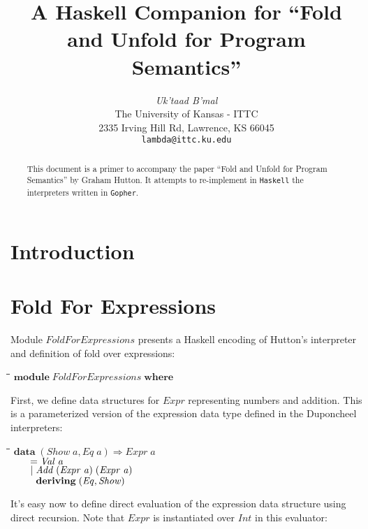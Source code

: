 \documentclass[10pt]{article}
\title{A Haskell Companion for ``Fold and Unfold for Program Semantics''}
\author{\emph{Uk'taad B'mal} \\
  The University of Kansas - ITTC \\
  2335 Irving Hill Rd, Lawrence, KS 66045 \\
  \texttt{lambda@ittc.ku.edu}}
\newlength{\lwidth}\setlength{\lwidth}{4.5cm}
\newlength{\cwidth}\setlength{\cwidth}{8mm} %
\newcommand{\Conid}[1]{\mathit{#1}}
\newcommand{\Varid}[1]{\mathit{#1}}
\begin{document}
\maketitle

\begin{abstract}

  This document is a primer to accompany the paper ``Fold and Unfold
  for Program Semantics'' by Graham Hutton.  It attempts to
  re-implement in \texttt{Haskell} the interpreters written in
  \texttt{Gopher}.

\end{abstract}

\section{Introduction}

\section{Fold For Expressions}

Module \ensuremath{\Conid{FoldForExpressions}} presents a Haskell encoding of
Hutton's interpreter and definition of fold over expressions:

\begin{tabbing}
\qquad\=\hspace{\lwidth}\=\hspace{\cwidth}\=\+\kill
${\mathbf{module}\;\Conid{FoldForExpressions}\;\mathbf{where}}$
\end{tabbing}
First, we define data structures for \ensuremath{\Conid{Expr}} representing numbers and
addition.  This is a parameterized version of the expression data type
defined in the Duponcheel interpreters:

\begin{tabbing}
\qquad\=\hspace{\lwidth}\=\hspace{\cwidth}\=\+\kill
${\mathbf{data}\;(\Conid{Show}\;\Varid{a},\Conid{Eq}\;\Varid{a})\Rightarrow \Conid{Expr}\;\Varid{a}}$\\
${\hskip2.00em\relax\mathrel{=}\Conid{Val}\;\Varid{a}}$\\
${\hskip2.00em\relax\mid \Conid{Add}\;(\Conid{Expr}\;\Varid{a})\;(\Conid{Expr}\;\Varid{a})}$\\
${\hskip2.00em\relax\phantom{\mid \mbox{}}\mathbf{deriving}\;(\Conid{Eq},\Conid{Show})}$
\end{tabbing}
It's easy now to define direct evaluation of the expression data
structure using direct recursion.  Note that \ensuremath{\Conid{Expr}} is instantiated
over \ensuremath{\Conid{Int}} in this evaluator:
\end{document}
